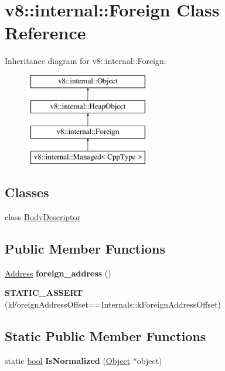 \hypertarget{classv8_1_1internal_1_1Foreign}{}\section{v8\+:\+:internal\+:\+:Foreign Class Reference}
\label{classv8_1_1internal_1_1Foreign}
Inheritance diagram for v8\+:\+:internal\+:\+:Foreign\+:\begin{figure}[H]
\begin{center}
\leavevmode
\includegraphics[height=4.000000cm]{classv8_1_1internal_1_1Foreign}
\end{center}
\end{figure}
\subsection*{Classes}
\begin{DoxyCompactItemize}
\item 
class \mbox{\hyperlink{classv8_1_1internal_1_1Foreign_1_1BodyDescriptor}{Body\+Descriptor}}
\end{DoxyCompactItemize}
\subsection*{Public Member Functions}
\begin{DoxyCompactItemize}
\item 
\mbox{\label{classv8_1_1internal_1_1Foreign_a83ec0799841a8ecfe8d629da4859b621}} 
\mbox{\hyperlink{classuintptr__t}{Address}} {\bfseries foreign\+\_\+address} ()
\item 
\mbox{\label{classv8_1_1internal_1_1Foreign_a045665be8925ea25c51632d5502d713e}} 
{\bfseries S\+T\+A\+T\+I\+C\+\_\+\+A\+S\+S\+E\+RT} (k\+Foreign\+Address\+Offset==Internals\+::k\+Foreign\+Address\+Offset)
\end{DoxyCompactItemize}
\subsection*{Static Public Member Functions}
\begin{DoxyCompactItemize}
\item 
\mbox{\label{classv8_1_1internal_1_1Foreign_aa1b20cf02ca55e34f3bcf80ad85428e5}} 
static \mbox{\hyperlink{classbool}{bool}} {\bfseries Is\+Normalized} (\mbox{\hyperlink{classv8_1_1internal_1_1Object}{Object}} $\ast$object)
\end{DoxyCompactItemize}
